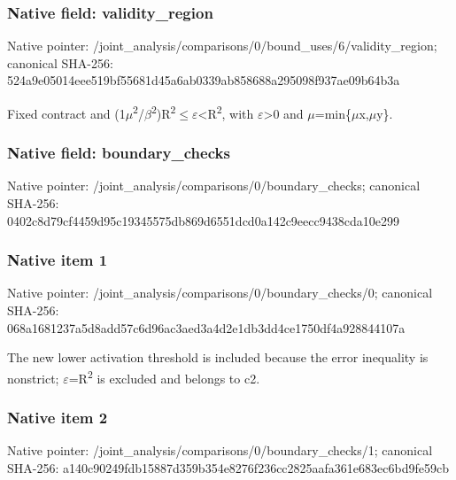 \documentclass[10pt,a4paper]{article}
\begin{document}
\subsubsection{Native field: validity\_region}


Native pointer: /joint\_analysis/comparis\allowbreak{}ons/0/bound\_uses/6/valid\allowbreak{}ity\_region; canonical SHA-256: 524a9e05014eee519bf55681\allowbreak{}d45a6ab0339ab858688a2950\allowbreak{}98f937ae09b64b3a


Fixed contract and (1\ensuremath{\mu}\textsuperscript{2}/\ensuremath{\beta}\textsuperscript{2})R\textsuperscript{2}\ensuremath{\le}\ensuremath{\varepsilon}<R\textsuperscript{2}, with \ensuremath{\varepsilon}>0 and \ensuremath{\mu}=min\{\ensuremath{\mu}x,\ensuremath{\mu}y\}.


\subsubsection{Native field: boundary\_checks}


Native pointer: /joint\_analysis/comparis\allowbreak{}ons/0/boundary\_checks; canonical SHA-256: 0402c8d79cf4459d95c19345\allowbreak{}575db869d6551dcd0a142c9e\allowbreak{}ecc9438cda10e299



\subsubsection{Native item 1}


Native pointer: /joint\_analysis/comparis\allowbreak{}ons/0/boundary\_checks/0; canonical SHA-256: 068a1681237a5d8add57c6d9\allowbreak{}6ac3aed3a4d2e1db3dd4ce17\allowbreak{}50df4a928844107a


The new lower activation threshold is included because the error inequality is nonstrict; \ensuremath{\varepsilon}=R\textsuperscript{2} is excluded and belongs to c2.


\subsubsection{Native item 2}


Native pointer: /joint\_analysis/comparis\allowbreak{}ons/0/boundary\_checks/1; canonical SHA-256: a140c90249fdb15887d359b3\allowbreak{}54e8276f236cc2825aafa361\allowbreak{}e683ec6bd9fe59cb
\end{document}
